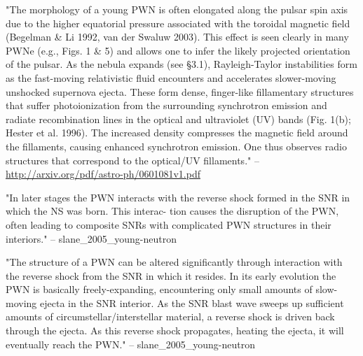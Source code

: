 "The morphology of a young PWN is often elongated along the pulsar spin
axis due to the higher equatorial pressure associated with the toroidal
magnetic field (Begelman \& Li 1992, van der Swaluw 2003). This effect
is seen clearly in many PWNe (e.g., Figs. 1 \& 5) and allows one to infer
the likely projected orientation of the pulsar. As the nebula expands (see
§3.1), Rayleigh-Taylor instabilities form as the fast-moving relativistic
fluid encounters and accelerates slower-moving unshocked supernova
ejecta. These form dense, finger-like fillamentary structures that suffer
photoionization from the surrounding synchrotron emission and radiate
recombination lines in the optical and ultraviolet (UV) bands (Fig. 1(b);
Hester et al. 1996). The increased density compresses the magnetic ﬁeld
around the fillaments, causing enhanced synchrotron emission. One
thus observes radio structures that correspond to the optical/UV
fillaments." -- \url{http://arxiv.org/pdf/astro-ph/0601081v1.pdf}


"In later stages the PWN interacts with the reverse shock formed in the
SNR in which the NS was born. This interac- tion causes the disruption of
the PWN, often leading to composite SNRs with complicated PWN structures
in their interiors." -- slane\_2005\_young-neutron

"The structure of a PWN can be altered significantly through interaction
with the reverse shock from the SNR in which it resides. In its early
evolution the PWN is basically freely-expanding, encountering only small
amounts of slow- moving ejecta in the SNR interior. As the SNR blast
wave sweeps up sufficient amounts of circumstellar/interstellar material,
a reverse shock is driven back through the ejecta. As this reverse shock
propagates, heating the ejecta, it will eventually reach the PWN."
-- slane\_2005\_young-neutron

